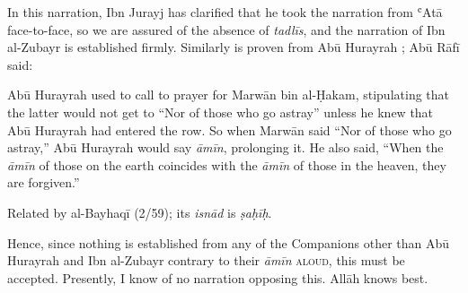 In this narration, Ibn Jurayj has clarified that he took the narration
from ʿAtā face-to-face, so we are assured of the absence of
\emph{tadlīs}, and the narration of Ibn al-Zubayr is established firmly.
Similarly is proven from Abū Hurayrah \mabpwhim; Abū Rāfī said:

\begin{mdframed}[style=narration, frametitle={Narration}]
Abū Hurayrah used to call to prayer for Marwān bin al-Ḥakam, stipulating that the latter would not get to “Nor of those who go astray” unless he knew that Abū Hurayrah had entered the row. So when Marwān said “Nor of those who go astray,” Abū Hurayrah would say \textit{āmīn}, prolonging it. He also said, “When the \textit{āmīn} of those on the earth coincides with the \textit{āmīn} of those in the heaven, they are forgiven.”
\end{mdframed}

Related by al-Bayhaqī (2/59); its \emph{isnād} is \emph{ṣaḥīḥ}.

Hence, since nothing is established from any of the Companions other
than Abū Hurayrah and Ibn al-Zubayr \mabpwthem contrary to their
\emph{āmīn} \textsc{aloud}, this must be accepted. Presently, I know of
no narration opposing this. Allāh knows best.
